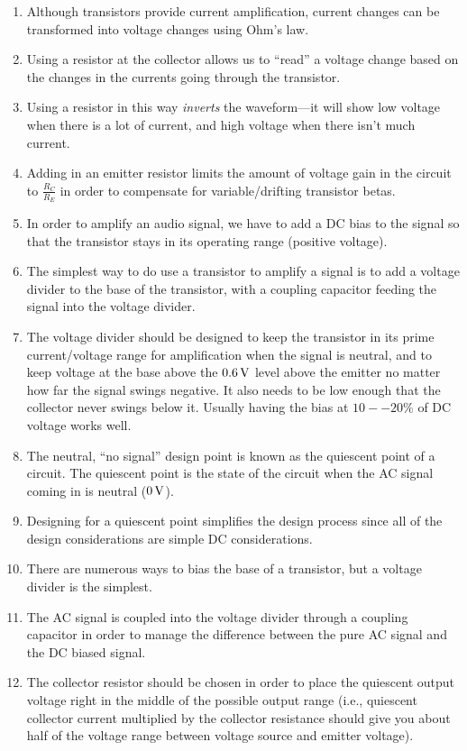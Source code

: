 \begin{enumerate}
\item Although transistors provide current amplification, current changes can be transformed into voltage changes using Ohm's law.
\item Using a resistor at the collector allows us to ``read'' a voltage change based on the changes in the currents going through the transistor.
\item Using a resistor in this way \emph{inverts} the waveform---it will show low voltage when there is a lot of current, and high voltage when there isn't much current.
\item Adding in an emitter resistor limits the amount of voltage gain in the circuit to $\frac{R_C}{R_E}$ in order to compensate for variable/drifting transistor betas.
\item In order to amplify an audio signal, we have to add a DC bias to the signal so that the transistor stays in its operating range (positive voltage).
\item The simplest way to do use a transistor to amplify a signal is to add a voltage divider to the base of the transistor, with a coupling capacitor feeding the signal into the voltage divider.
\item The voltage divider should be designed to keep the transistor in its prime current/voltage range for amplification when the signal is neutral, and to keep voltage at the base above the $0.6\,\si{\volt}$ level above the emitter no matter how far the signal swings negative.  It also needs to be low enough that the collector never swings below it.  Usually having the bias at $10--20\%$ of DC voltage works well.
\item The neutral, ``no signal'' design point is known as the quiescent point of a circuit.  The quiescent point is the state of the circuit when the AC signal coming in is neutral ($0\,\si{\volt}$).  
\item Designing for a quiescent point simplifies the design process since all of the design considerations are simple DC considerations.
\item There are numerous ways to bias the base of a transistor, but a voltage divider is the simplest.
\item The AC signal is coupled into the voltage divider through a coupling capacitor in order to manage the difference between the pure AC signal and the DC biased signal.
\item The collector resistor should be chosen in order to place the quiescent output voltage right in the middle of the possible output range (i.e., quiescent collector current multiplied by the collector resistance should give you about half of the voltage range between voltage source and emitter voltage).

\end{enumerate}
